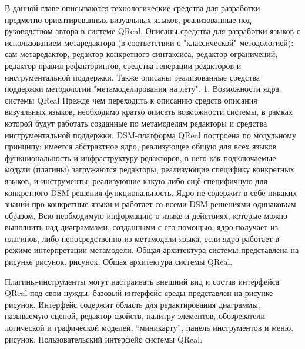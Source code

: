 В данной главе описываются технологические средства для разработки предметно-ориентированных визуальных языков, реализованные под руководством автора в системе QReal. Описаны средства для разработки языков с использованием метаредактора (в соответствии с "классической" методологией): сам метаредактор, редактор конкретного синтаксиса, редактор ограничений, редактор правил рефакторингов, средства генерации редакторов и инструментальной поддержки. Также описаны реализованные средства поддержки методологии "метамоделирования на лету".
1. Возможности ядра системы QReal
Прежде чем переходить к описанию средств описания визуальных языков, необходимо кратко описать возможности системы, в рамках которой будут работать созданные по метамоделям редакторы и средства инструментальной поддержки. DSM-платформа QReal построена по модульному принципу: имеется абстрактное ядро, реализующее общую для всех языков функциональность и инфраструктуру редакторов, в него как подключаемые модули (плагины) загружаются редакторы, реализующие специфику конкретных языков, и инструменты, реализующие какую-либо ещё специфичную для конкретного DSM-решения функциональность. Ядро не содержит в себе никаких знаний про конкретные языки и работает со всеми DSM-решениями одинаковым образом. Всю необходимую информацию о языке и действиях, которые можно выполнить над диаграммами, созданными с его помощью, ядро получает из плагинов, либо непосредственно из метамодели языка, если ядро работает в режиме интерпретации метамодели. Общая архитектура системы представлена на рисунке рисунок.
рисунок. Общая архитектура системы QReal.

Плагины-инструменты могут настраивать внешний вид и состав интерфейса QReal под свои нужды, базовый интерфейс среды представлен на рисунке рисунок. Интерфейс содержит область для редактирования диаграммы, называемую сценой, редактор свойств, палитру элементов, обозреватели логической и графической моделей, “миникарту”, панель инструментов и меню.
рисунок. Пользовательский интерфейс системы QReal.

